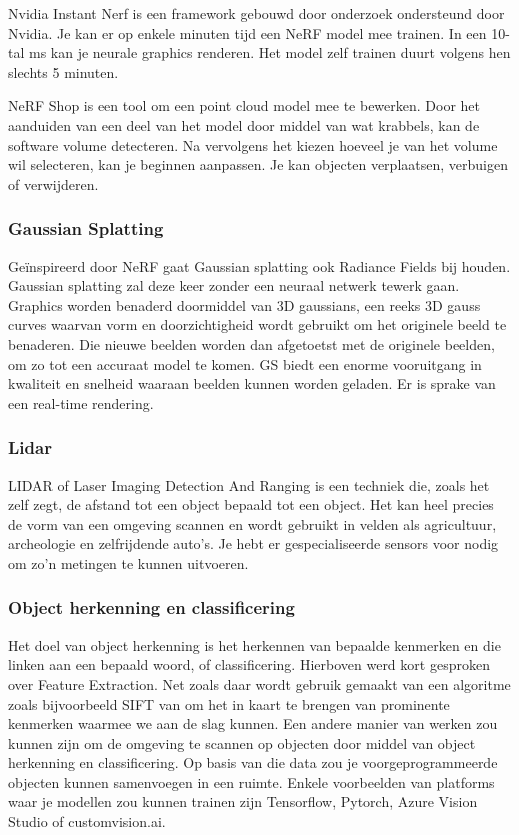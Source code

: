 \documentclass{hogent-article}
\begin{document}
Nvidia Instant Nerf is een framework gebouwd door onderzoek ondersteund door Nvidia. Je kan er op enkele minuten tijd een NeRF model mee trainen. In een 10-tal ms kan je neurale graphics renderen. Het model zelf trainen duurt volgens hen slechts 5 minuten. 
\autocite{Mueller2022}

NeRF Shop is een tool om een point cloud model mee te bewerken. Door het aanduiden van een deel van het model door middel van wat krabbels, kan de software volume detecteren. Na vervolgens het kiezen hoeveel je van het volume wil selecteren, kan je beginnen aanpassen. 
Je kan objecten verplaatsen, verbuigen of verwijderen.\autocite{NeRFshop23}

\subsubsection{Gaussian Splatting}

Geïnspireerd door NeRF gaat Gaussian splatting ook Radiance Fields bij houden. Gaussian splatting zal deze keer zonder een neuraal netwerk tewerk gaan. Graphics worden benaderd doormiddel van 3D gaussians, een reeks 3D gauss curves waarvan vorm en doorzichtigheid wordt gebruikt om het originele beeld te benaderen. Die nieuwe beelden worden dan afgetoetst met de originele beelden, om zo tot een accuraat model te komen.
GS biedt een enorme vooruitgang in kwaliteit en snelheid waaraan beelden kunnen worden geladen. Er is sprake van een real-time rendering. \autocite{kerbl3Dgaussians}

\subsubsection{Lidar}

LIDAR of Laser Imaging Detection And Ranging is een techniek die, zoals het zelf zegt, de afstand tot een object bepaald tot een object. Het kan heel precies de vorm van een omgeving scannen en wordt gebruikt in velden als agricultuur, archeologie en zelfrijdende auto’s. Je hebt er gespecialiseerde sensors voor nodig om zo’n metingen te kunnen uitvoeren.

\subsubsection{Object herkenning en classificering}

Het doel van object herkenning is het herkennen van bepaalde kenmerken en die linken aan een bepaald woord, of classificering. Hierboven werd kort gesproken over Feature Extraction. Net zoals daar wordt gebruik gemaakt van een algoritme zoals bijvoorbeeld SIFT van \textcite{Schonberger2016} om het in kaart te brengen van prominente kenmerken waarmee we aan de slag kunnen. 
Een andere manier van werken zou kunnen zijn om de omgeving te scannen op objecten door middel van object herkenning en classificering. Op basis van die data zou je voorgeprogrammeerde objecten kunnen samenvoegen in een ruimte. 
Enkele voorbeelden van platforms waar je modellen zou kunnen trainen zijn Tensorflow, Pytorch, Azure Vision Studio of customvision.ai. 
\end{document}
